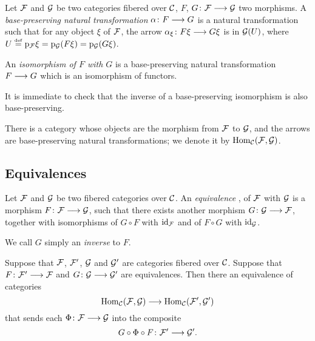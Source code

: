 \begin{3   FIBERED CATEGORIES}
\begin{3.5 Equivalences of fibered categories}
\begin{definition}\label{def:morfunctors} Let $\mathcal{F}$ and $\mathcal{G}$ be two categories fibered over $\mathcal{C}$, $F$, $G \colon \cF \arr \cG$ two morphisms. A \emph{base-preserving natural transformation}%
%
 $\alpha\colon F \arr G$ is a natural transformation such that for any object $\xi$ of $\mathcal{F}$, the arrow $\alpha_\xi \colon F \xi \arr G \xi$ is in $\mathcal{G}(U)$, where $U \overset{\mathrm{\scriptscriptstyle def}} = \mathrm{p}_{\mathcal{F}} \xi = \mathrm{p}_{\mathcal{G}}(F \xi) = \mathrm{p}_{\mathcal{G}}(G \xi)$.

An \emph{isomorphism of $F$ with $G$} is a base-preserving natural transformation $F \arr G$ which is an isomorphism of functors. 
\end{definition}


It is immediate to check that the inverse of a base-preserving isomorphism is also base-preserving.

There is a category whose objects are the morphism from $\mathcal{F}$ to $\mathcal{G}$, and the arrows are base-preserving natural transformations; we denote it by $\operatorname{Hom}_{\mathcal{C}}(\mathcal{F}, \mathcal{G})$.



\subsection{Equivalences}

\begin{definition} Let $\mathcal{F}$ and $\mathcal{G}$ be two fibered categories over $\mathcal{C}$. An \emph{equivalence}%
, of $\mathcal{F}$ with $\mathcal{G}$ is a morphism $F \colon \cF \arr \cG$, such that there exists another morphism $G \colon \cG \arr \cF$, together with isomorphisms of $G \circ F$ with $\mathrm{id}_{\mathcal{F}}$ and of $F \circ G$ with $\mathrm{id}_{\mathcal{G}}$.

We call $G$ simply an \emph{inverse} to $F$.
\end{definition}

\begin{proposition}\label{prop:equiv->equivalenthom}
Suppose that $\mathcal{F}$, $\mathcal{F}'$, $\mathcal{G}$ and $\mathcal{G}'$ are categories fibered over $\mathcal{C}$. Suppose  that $F \colon \cF' \arr \cF$ and $G \colon \cG \arr \cG'$ are equivalences. Then there an equivalence of categories
   \[
   \hom_{\cC}(\cF, \cG) \arr
   \hom_{\cC}(\cF', \cG')
   \]
that sends each $\Phi \colon \cF \arr \cG$ into the composite
   \[
   G \circ \Phi \circ F \colon \cF' \arr \cG'.
   \]
\end{proposition}


\end{3.5 Equivalences of fibered categories}
\end{3   FIBERED CATEGORIES}
